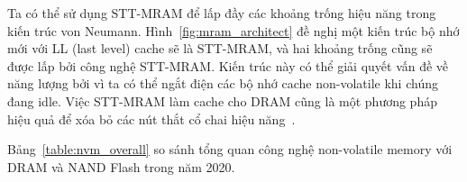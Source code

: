 Ta có thể sử dụng STT-MRAM để lấp đầy các khoảng trống hiệu năng trong kiến
trúc von Neumann. Hình~\ref{fig:mram_architect} đề nghị một kiến trúc bộ nhớ
mới với LL (last level) cache sẽ là STT-MRAM, và hai khoảng trống cũng sẽ được
lấp bởi công nghệ STT-MRAM. Kiến trúc này có thể giải quyết vấn đề về năng
lượng bởi vì ta có thể ngắt điện các bộ nhớ cache non-volatile khi chúng đang
idle. Việc STT-MRAM làm cache cho DRAM cũng là một phương pháp hiệu quả để xóa
bỏ các nút thắt cổ chai hiệu
năng~\cite{hanyuSpintransfertorqueMagnetoresistiveRandomaccess2019}.


Bảng~\ref{table:nvm_overall} so sánh tổng quan công nghệ non-volatile memory với
DRAM và NAND Flash trong năm 2020.

\begin{table}[ht!]
\caption{So sánh đặc điểm của các công nghệ non-volatile memory với DRAM và NAND
Flash NAND Flash~\cite{bahnImplicationsNVMBased2020}.}
\label{table:nvm_overall}
\end{table}